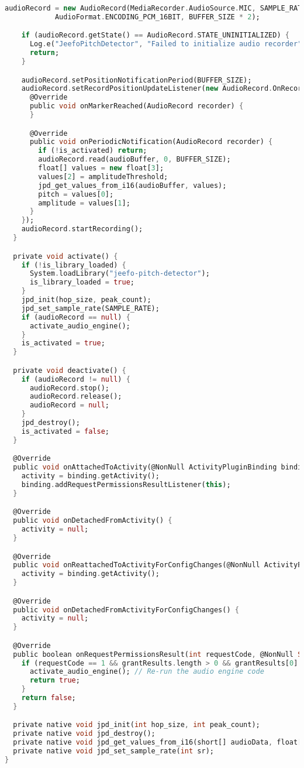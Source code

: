 \begin{lstlisting}[language=Dart, caption=Java хэл дахь FFT хэрэгжүүлэлт, frame=single]
    audioRecord = new AudioRecord(MediaRecorder.AudioSource.MIC, SAMPLE_RATE, AudioFormat.CHANNEL_IN_MONO,
            AudioFormat.ENCODING_PCM_16BIT, BUFFER_SIZE * 2);

    if (audioRecord.getState() == AudioRecord.STATE_UNINITIALIZED) {
      Log.e("JeefoPitchDetector", "Failed to initialize audio recorder");
      return;
    }

    audioRecord.setPositionNotificationPeriod(BUFFER_SIZE);
    audioRecord.setRecordPositionUpdateListener(new AudioRecord.OnRecordPositionUpdateListener() {
      @Override
      public void onMarkerReached(AudioRecord recorder) {
      }

      @Override
      public void onPeriodicNotification(AudioRecord recorder) {
        if (!is_activated) return;
        audioRecord.read(audioBuffer, 0, BUFFER_SIZE);
        float[] values = new float[3];
        values[2] = amplitudeThreshold;
        jpd_get_values_from_i16(audioBuffer, values);
        pitch = values[0];
        amplitude = values[1];
      }
    });
    audioRecord.startRecording();
  }

  private void activate() {
    if (!is_library_loaded) {
      System.loadLibrary("jeefo-pitch-detector");
      is_library_loaded = true;
    }
    jpd_init(hop_size, peak_count);
    jpd_set_sample_rate(SAMPLE_RATE);
    if (audioRecord == null) {
      activate_audio_engine();
    }
    is_activated = true;
  }

  private void deactivate() {
    if (audioRecord != null) {
      audioRecord.stop();
      audioRecord.release();
      audioRecord = null;
    }
    jpd_destroy();
    is_activated = false;
  }

  @Override
  public void onAttachedToActivity(@NonNull ActivityPluginBinding binding) {
    activity = binding.getActivity();
    binding.addRequestPermissionsResultListener(this);
  }

  @Override
  public void onDetachedFromActivity() {
    activity = null;
  }

  @Override
  public void onReattachedToActivityForConfigChanges(@NonNull ActivityPluginBinding binding) {
    activity = binding.getActivity();
  }

  @Override
  public void onDetachedFromActivityForConfigChanges() {
    activity = null;
  }

  @Override
  public boolean onRequestPermissionsResult(int requestCode, @NonNull String[] permissions, @NonNull int[] grantResults) {
    if (requestCode == 1 && grantResults.length > 0 && grantResults[0] == PackageManager.PERMISSION_GRANTED) {
      activate_audio_engine(); // Re-run the audio engine code
      return true;
    }
    return false;
  }

  private native void jpd_init(int hop_size, int peak_count);
  private native void jpd_destroy();
  private native void jpd_get_values_from_i16(short[] audioData, float[] values);
  private native void jpd_set_sample_rate(int sr);
}
\end{lstlisting}

